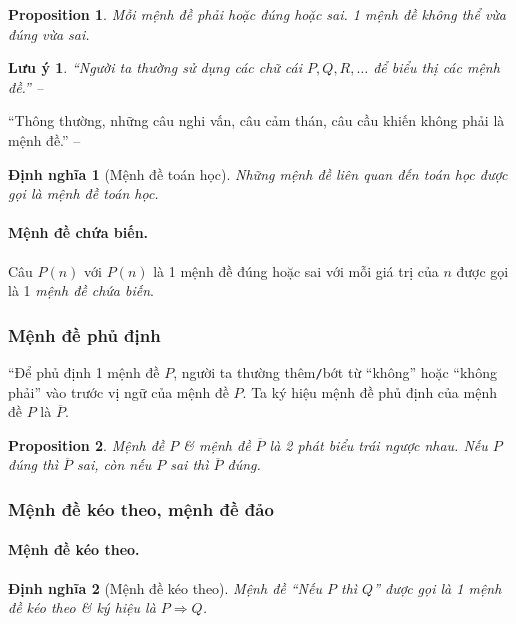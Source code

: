 \documentclass{article}
\numberwithin{equation}{section}
\newtheorem{definition}{Định nghĩa}[section]
\newtheorem{proposition}{Proposition}[section]
\newtheorem{remark}{Lưu ý}[section]
\begin{document}
\begin{proposition}
	Mỗi mệnh đề phải hoặc đúng hoặc sai. 1 mệnh đề không thể vừa đúng vừa sai.
\end{proposition}

\begin{remark}
	``Người ta thường sử dụng các chữ cái $P,Q,R,\ldots$ để biểu thị các mệnh đề.'' -- \cite[p. 6]{Khoai_Anh_Tan_Thang_Anh_Cuong_Duong_Dang_Ha_Hanh_Hong_Son_Tuan_Vuong_Toan_10_tap_1}
\end{remark}
``Thông thường, những câu nghi vấn, câu cảm thán, câu cầu khiến không phải là mệnh đề.'' -- \cite[p. 6]{Khoai_Anh_Tan_Thang_Anh_Cuong_Duong_Dang_Ha_Hanh_Hong_Son_Tuan_Vuong_Toan_10_tap_1}

\begin{definition}[Mệnh đề toán học]
	Những mệnh đề liên quan đến toán học được gọi là \emph{mệnh đề toán học}.
\end{definition}

\paragraph{Mệnh đề chứa biến.} Câu $P(n)$ với $P(n)$ là 1 mệnh đề đúng hoặc sai với mỗi giá trị của $n$ được gọi là 1 \emph{mệnh đề chứa biến}.

\subsubsection{Mệnh đề phủ định}
``Để phủ định 1 mệnh đề $P$, người ta thường thêm\texttt{/}bớt từ ``không'' hoặc ``không phải'' vào trước vị ngữ của mệnh đề $P$. Ta ký hiệu mệnh đề phủ định của mệnh đề $P$ là $\overline{P}$.

\begin{proposition}
	Mệnh đề $P$ \& mệnh đề $\overline{P}$ là 2 phát biểu trái ngược nhau. Nếu $P$ đúng thì $\overline{P}$ sai, còn nếu $P$ sai thì $\overline{P}$ đúng.
\end{proposition}

\subsubsection{Mệnh đề kéo theo, mệnh đề đảo}

\paragraph{Mệnh đề kéo theo.}
\begin{definition}[Mệnh đề kéo theo]
	Mệnh đề ``Nếu $P$ thì $Q$'' được gọi là 1 \emph{mệnh đề kéo theo} \& ký hiệu là $P\Rightarrow Q$.
\end{definition}
\end{document}
